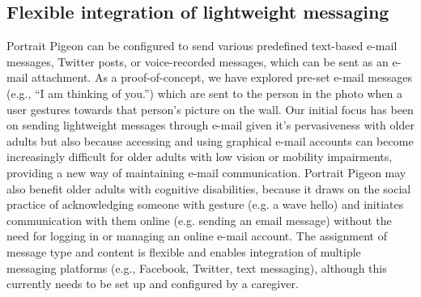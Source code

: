 \documentclass{chi-ext}
\begin{document}
\subsection{Flexible integration of lightweight messaging}
Portrait Pigeon can be configured to send various predefined text-based e-mail messages, Twitter posts, or voice-recorded messages, which can be sent as an e-mail attachment. As a proof-of-concept, we have explored pre-set e-mail messages (e.g., ``I am thinking of you.'') which are sent to the person in the photo when a user gestures towards that person's picture on the wall. Our initial focus has been on sending lightweight messages through e-mail given it's pervasiveness with older adults \cite{Pew2012} but also because accessing and using graphical e-mail accounts can become increasingly difficult for older adults with low vision or mobility impairments, providing a new way of maintaining e-mail communication. Portrait Pigeon may also benefit older adults with cognitive disabilities, because it draws on the social practice of acknowledging someone with gesture (e.g. a wave hello) and initiates communication with them online (e.g. sending an email message) without the need for logging in or managing an online e-mail account. The assignment of message type and content is flexible and enables integration of multiple messaging platforms (e.g., Facebook, Twitter, text messaging), although this currently needs to be set up and configured by a caregiver.

\end{document}
